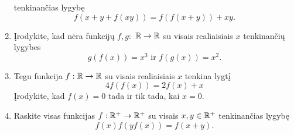 \begin{enumerate}
    tenkinančias lygybę $$f(x+y +f(xy)) = f(f(x+y)) + xy.$$
  \item Įrodykite, kad nėra funkcijų $f,g:$ $\mathbb R \to \mathbb R$ su visais
    realiaisiais $x$ tenkinančių lygybes $$g(f(x)) = x^3 \text{ ir }
    f(g(x))=x^2.$$
  \item Tegu funkcija $f: \mathbb R \to \mathbb R$ su visais realiaisiais $x$ tenkina
    lygtį $$4f(f(x))= 2f(x)+x$$ Įrodykite, kad $f(x)=0$ tada ir tik tada,
    kai $x=0$.
  \item Raskite visas funkcijas $f:\mathbb R^+\to\mathbb R^+$ su visais $x, y \in \mathbb R^+$
    tenkinančias lygybę $$f(x)f(yf(x))=f(x+y).$$

\end{enumerate}

